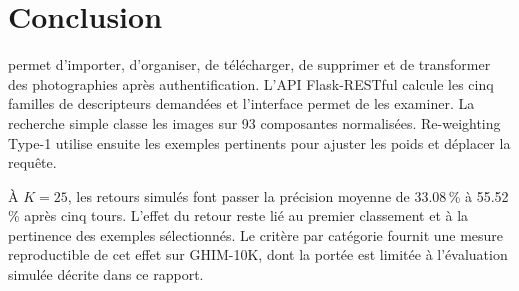 \section{Conclusion}
\projet{} permet d'importer, d'organiser, de télécharger, de supprimer et de transformer des photographies après authentification. L'API Flask-RESTful calcule les cinq familles de descripteurs demandées et l'interface permet de les examiner. La recherche simple classe les images sur 93 composantes normalisées. Re-weighting Type-1 utilise ensuite les exemples pertinents pour ajuster les poids et déplacer la requête.

À \(K=25\), les retours simulés font passer la précision moyenne de \num{33.08}\,\% à \num{55.52}\,\% après cinq tours. L'effet du retour reste lié au premier classement et à la pertinence des exemples sélectionnés. Le critère par catégorie fournit une mesure reproductible de cet effet sur GHIM-10K, dont la portée est limitée à l'évaluation simulée décrite dans ce rapport.
